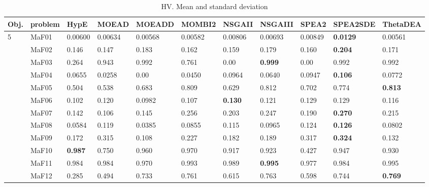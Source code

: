 \documentclass[]{article}
\begin{document}
\begin{landscape}
\begin{table}
\caption{HV. Mean and standard deviation}
\label{table:mean.HV}
\centering
\begin{footnotesize}
\begin{tabular}{|l|l|l|l|l|l|l|l|l|l|l|}
\hline
Obj. & problem  & HypE & MOEAD & MOEADD & MOMBI2 & NSGAII & NSGAIII & SPEA2 & SPEA2SDE & ThetaDEA \\ \hline

\multirow{15}{*}{5} & MaF01 & 0.00600 & 0.00634 & 0.00568 & 0.00582 & \cellcolor{gray95} 0.00806 & 0.00693 & \cellcolor{gray95} 0.00849 & \cellcolor{gray95} {\bf 0.0129} & 0.00561\\
 & MaF02 & 0.146 & 0.147 & \cellcolor{gray95} 0.183 & 0.162 & 0.159 & \cellcolor{gray95} 0.179 & 0.160 & \cellcolor{gray95} {\bf 0.204} & 0.171\\
 & MaF03 & 0.264 & \cellcolor{gray95} 0.943 & 0.992 & 0.761 & 0.00 & \cellcolor{gray95} {\bf 0.999} & 0.00 & 0.992 & 0.992\\
 & MaF04 & 0.0655 & 0.0258 & 0.00 & 0.0450 & \cellcolor{gray95} 0.0964 & 0.0640 & \cellcolor{gray95} 0.0947 & \cellcolor{gray95} {\bf 0.106} & 0.0772\\
 & MaF05 & 0.504 & 0.538 & 0.683 & \cellcolor{gray95} 0.809 & 0.629 & \cellcolor{gray95} 0.812 & 0.702 & 0.774 & \cellcolor{gray95} {\bf 0.813}\\
 & MaF06 & 0.102 & 0.120 & 0.0982 & 0.107 & \cellcolor{gray95} {\bf 0.130} & 0.121 & \cellcolor{gray95} 0.129 & \cellcolor{gray95} 0.129 & 0.116\\
 & MaF07 & 0.142 & 0.106 & 0.145 & \cellcolor{gray95} 0.256 & 0.203 & \cellcolor{gray95} 0.247 & 0.190 & \cellcolor{gray95} {\bf 0.270} & 0.215\\
 & MaF08 & 0.0584 & \cellcolor{gray95} 0.119 & 0.0385 & 0.0855 & 0.115 & 0.0965 & \cellcolor{gray95} 0.124 & \cellcolor{gray95} {\bf 0.126} & 0.0802\\
 & MaF09 & 0.172 & \cellcolor{gray95} 0.315 & 0.108 & 0.227 & 0.182 & 0.189 & \cellcolor{gray95} 0.317 & \cellcolor{gray95} {\bf 0.324} & 0.132\\
 & MaF10 & \cellcolor{gray95} {\bf 0.987} & 0.750 & \cellcolor{gray95} 0.960 & \cellcolor{gray95} 0.970 & 0.917 & 0.923 & 0.427 & 0.947 & 0.930\\
 & MaF11 & 0.984 & 0.984 & 0.970 & \cellcolor{gray95} 0.993 & 0.989 & \cellcolor{gray95} {\bf 0.995} & 0.977 & 0.984 & \cellcolor{gray95} 0.995\\
 & MaF12 & 0.285 & 0.494 & 0.733 & \cellcolor{gray95} 0.761 & 0.615 & \cellcolor{gray95} 0.763 & 0.598 & 0.744 & \cellcolor{gray95} {\bf 0.769}\\

\end{tabular}
\end{footnotesize}
\end{table}
\end{landscape}
\end{document}
